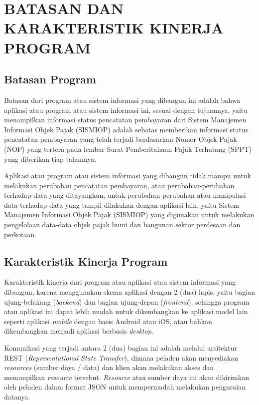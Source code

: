 \chapter{BATASAN DAN KARAKTERISTIK KINERJA PROGRAM}

\section{Batasan Program}

Batasan dari program atau sistem informasi yang dibangun ini adalah bahwa aplikasi atau program atau sistem informasi ini, sesuai dengan tujuannya, yaitu menampilkan informasi status pencatatan pembayaran dari Sistem Manajemen Informasi Objek Pajak (SISMIOP) adalah sebatas memberikan informasi status pencatatan pembayaran yang telah terjadi berdasarkan Nomor Objek Pajak (NOP) yang tertera pada lembar Surat Pemberitahuan Pajak Terhutang (SPPT) yang diberikan tiap tahunnya.

Aplikasi atau program atau sistem informasi yang dibangun tidak mampu untuk melakukan perubahan pencatatan pembayaran, atau perubahan-perubahan terhadap data yang ditayangkan, untuk perubahan-perubahan atau manipulasi data terhadap data yang tampil dilakukan dengan aplikasi lain, yaitu Sistem Manajemen Informasi Objek Pajak (SISMIOP) yang digunakan untuk melakukan pengelolaan data-data objek pajak bumi dan bangunan sektor perdesaan dan perkotaan.

\section{Karakteristik Kinerja Program}

Karakteristik kinerja dari program atau aplikasi atau sistem informasi yang dibangun, karena menggunakan skema aplikasi dengan 2 (dua) lapis, yaitu bagian ujung-belakang (\textit{backend}) dan bagian ujung-depan (\textit{frontend}), sehingga program atau aplikasi ini dapat lebih mudah untuk dikembangkan ke aplikasi model lain seperti aplikasi \textit{mobile} dengan basis Android atau iOS, atau bahkan dikembangkan menjadi aplikasi berbasis \textit{desktop}.

Komunikasi yang terjadi antara 2 (dua) bagian ini adalah melalui arsitektur REST (\textit{Representational State Transfer}), dimana peladen akan menyediakan \textit{resources} (sumber daya / data) dan klien akan melakukan akses dan menampilkan \textit{resource} tersebut. \textit{Resource} atau sumber daya ini akan dikirimkan oleh peladen dalam format JSON untuk mempermudah melakukan penguraian datanya.